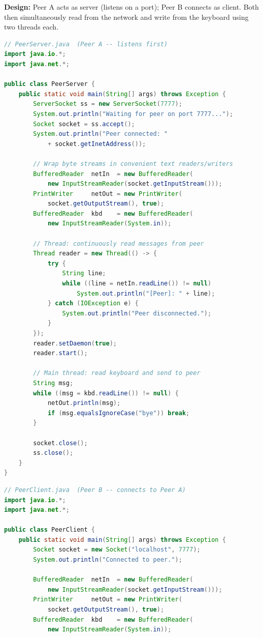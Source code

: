 \documentclass[12pt,a3paper]{article}
\begin{document}
\begin{enumerate}
\begin{tcolorbox}
\textbf{Design:} Peer A acts as server (listens on a
port); Peer B connects as client. Both then
simultaneously read from the network and write from
the keyboard using two threads each.

\begin{lstlisting}[language=Java]
// PeerServer.java  (Peer A -- listens first)
import java.io.*;
import java.net.*;

public class PeerServer {
    public static void main(String[] args) throws Exception {
        ServerSocket ss = new ServerSocket(7777);
        System.out.println("Waiting for peer on port 7777...");
        Socket socket = ss.accept();
        System.out.println("Peer connected: "
            + socket.getInetAddress());

        // Wrap byte streams in convenient text readers/writers
        BufferedReader  netIn  = new BufferedReader(
            new InputStreamReader(socket.getInputStream()));
        PrintWriter     netOut = new PrintWriter(
            socket.getOutputStream(), true);
        BufferedReader  kbd    = new BufferedReader(
            new InputStreamReader(System.in));

        // Thread: continuously read messages from peer
        Thread reader = new Thread(() -> {
            try {
                String line;
                while ((line = netIn.readLine()) != null)
                    System.out.println("[Peer]: " + line);
            } catch (IOException e) {
                System.out.println("Peer disconnected.");
            }
        });
        reader.setDaemon(true);
        reader.start();

        // Main thread: read keyboard and send to peer
        String msg;
        while ((msg = kbd.readLine()) != null) {
            netOut.println(msg);
            if (msg.equalsIgnoreCase("bye")) break;
        }

        socket.close();
        ss.close();
    }
}
\end{lstlisting}

\begin{lstlisting}[language=Java]
// PeerClient.java  (Peer B -- connects to Peer A)
import java.io.*;
import java.net.*;

public class PeerClient {
    public static void main(String[] args) throws Exception {
        Socket socket = new Socket("localhost", 7777);
        System.out.println("Connected to peer.");

        BufferedReader  netIn  = new BufferedReader(
            new InputStreamReader(socket.getInputStream()));
        PrintWriter     netOut = new PrintWriter(
            socket.getOutputStream(), true);
        BufferedReader  kbd    = new BufferedReader(
            new InputStreamReader(System.in));


\end{lstlisting}
\end{tcolorbox}
\end{enumerate}
\end{document}
